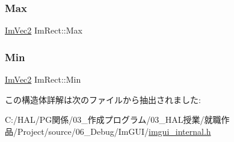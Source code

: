 \subsubsection{\texorpdfstring{Max}{Max}}
{\footnotesize\ttfamily \mbox{\hyperlink{struct_im_vec2}{Im\+Vec2}} Im\+Rect\+::\+Max}

\mbox{\label{struct_im_rect_af8f3fbf7ec983e03548b88e14ba68aa8}} 
\subsubsection{\texorpdfstring{Min}{Min}}
{\footnotesize\ttfamily \mbox{\hyperlink{struct_im_vec2}{Im\+Vec2}} Im\+Rect\+::\+Min}



この構造体詳解は次のファイルから抽出されました\+:\begin{DoxyCompactItemize}
\item 
C\+:/\+H\+A\+L/\+P\+G関係/03\+\_\+作成プログラム/03\+\_\+\+H\+A\+L授業/就職作品/\+Project/source/06\+\_\+\+Debug/\+Im\+G\+U\+I/\mbox{\hyperlink{imgui__internal_8h}{imgui\+\_\+internal.\+h}}\end{DoxyCompactItemize}
